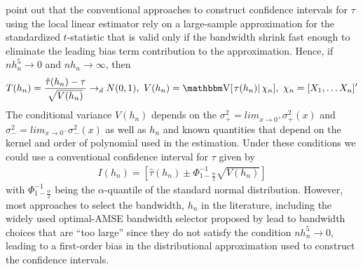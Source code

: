 \documentclass[12pt,fleqn]{article}
\begin{document}
\cite{calonico2014} point out that the conventional approaches to construct confidence intervals for $\tau$ using the local linear estimator rely on a large-sample approximation for the standardized $t$-statistic that is valid only if the bandwidth shrink fast enough to eliminate the leading bias term contribution to the approximation. Hence, if $nh_{n}^{5}\rightarrow0$ and $nh_{n}\rightarrow \infty$, then
 \begin{align}
  T(h_{n})=\frac{\hat{\tau}(h_{n})-\tau}{\sqrt{V(h_{n})}}\rightarrow_{d}N(0,1), \text{        }V(h_{n})=\V[\left.\tau(h_{n})\right|\chi_{n}], \text{        }\chi_{n}=[X_{1}, \dots X_{n}]^{\prime}
 \end{align}
 The conditional variance $V(h_{n})$ depends on the $\sigma^{2}_{+}=lim_{x \rightarrow 0^{+}}\sigma^{2}_{+}(x)$ and $\sigma^{2}_{-}=lim_{x \rightarrow 0^{-}}\sigma^{2}_{-}(x)$ as well as $h_{n}$ and known quantities that depend on the kernel and order of polynomial used in the estimation. Under these conditions we could use a conventional confidence interval for $\tau$ given by
 \begin{align}
  I(h_{n})=\left[\hat{\tau}(h_{n})\pm \Phi^{-1}_{1-\frac{\alpha}{2}}\sqrt{V(h_{n})} \right]
 \end{align}
with $\Phi^{-1}_{1-\frac{\alpha}{2}}$ being the $\alpha$-quantile of the standard normal distribution. However, most approaches to select the bandwidth, $h_{n}$ in the literature, including the widely used optimal-AMSE bandwidth selector proposed by \cite{IK} lead to bandwidth choices that are ``too large'' since they do not satisfy the condition $nh_{n}^{5}\rightarrow0$, leading to a first-order bias in the distributional approximation used to construct the confidence intervals.
\end{document}
